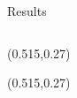 \documentclass{beamer}
\begin{document}
\begin{frame}{Results}
\begin{columns}
\begin{center}
\begin{textblock}{0.48}
\end{textblock}
\begin{textblock}{0.48}(0.515,0.27)
\end{textblock}
\begin{textblock}{0.48}(0.515,0.27)

\end{textblock}
\end{center}
\end{columns}
\end{frame}
\end{document}
